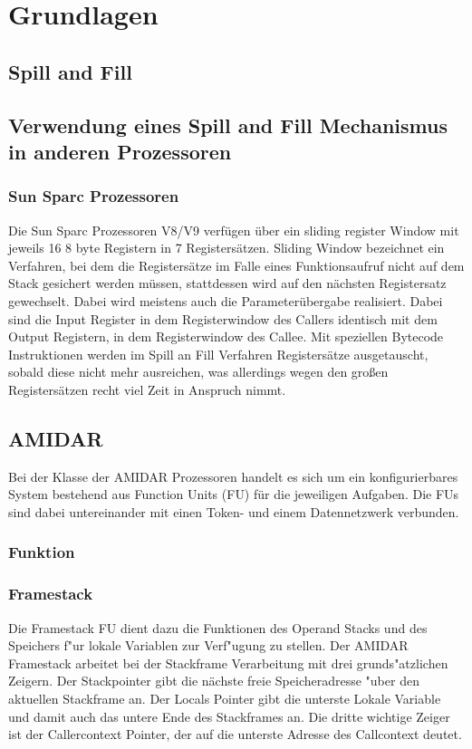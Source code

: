 \chapter{Grundlagen}
\label{cha:Grundlagen}

\section{Spill and Fill}
\section{Verwendung eines Spill and Fill Mechanismus in anderen Prozessoren}
\subsection{Sun Sparc Prozessoren}
Die Sun Sparc Prozessoren V8/V9 verf\"ugen \"uber ein sliding register Window mit jeweils 16 8 byte Registern in 7 Registers\"atzen. Sliding Window bezeichnet ein Verfahren, bei dem die Registers\"atze im Falle eines Funktionsaufruf nicht auf dem Stack gesichert werden m\"ussen, stattdessen wird auf den n\"achsten Registersatz gewechselt. Dabei wird meistens auch die Parameter\"ubergabe realisiert. Dabei sind die Input Register in dem Registerwindow des Callers identisch mit dem Output Registern, in dem Registerwindow des Callee.   
Mit speziellen Bytecode Instruktionen werden im Spill an Fill Verfahren Registers\"atze ausgetauscht, sobald diese nicht mehr ausreichen, was allerdings wegen den großen Registers\"atzen recht viel Zeit in Anspruch nimmt.
\section{AMIDAR}
Bei der Klasse der AMIDAR Prozessoren handelt es sich um ein konfigurierbares System bestehend aus Function Units (FU) für die jeweiligen Aufgaben. Die FUs sind dabei untereinander mit einen Token- und einem Datennetzwerk verbunden. 
\subsection{Funktion}



\subsection{Framestack}

Die Framestack FU dient dazu die Funktionen des Operand Stacks und des Speichers f"ur lokale Variablen zur Verf"ugung zu stellen. 
Der AMIDAR Framestack arbeitet bei der Stackframe Verarbeitung mit drei grunds"atzlichen Zeigern. Der Stackpointer gibt die nächste freie Speicheradresse "uber den aktuellen Stackframe an. Der Locals Pointer gibt die unterste Lokale Variable und damit auch das untere Ende des Stackframes an. Die dritte wichtige Zeiger ist der Callercontext Pointer, der auf die unterste Adresse des Callcontext deutet. 


